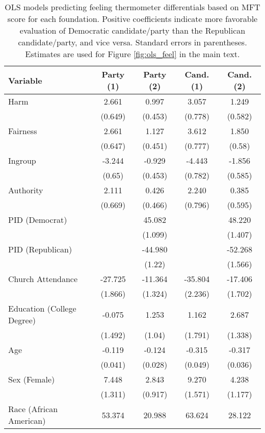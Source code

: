 \begin{table}[h]
\centering
\caption{OLS models predicting feeling thermometer differentials based on
           MFT score for each foundation. Positive coefficients indicate more favorable evaluation 
           of Democratic candidate/party than the Republican candidate/party, and vice versa. 
           Standard errors in parentheses. Estimates are used for Figure \ref{fig:ols_feel} 
           in the main text.} 
\label{tab:ols_feel}
\begingroup\footnotesize
\begin{tabular}{lcccc}
  \hline
Variable & Party (1) & Party (2) & Cand. (1) & Cand. (2) \\ 
  \hline
Harm &   2.661 &   0.997 &   3.057 &   1.249 \\ 
   & (0.649) & (0.453) & (0.778) & (0.582) \\ 
  Fairness &   2.661 &   1.127 &   3.612 &   1.850 \\ 
   & (0.647) & (0.451) & (0.777) & (0.58) \\ 
  Ingroup &  -3.244 &  -0.929 &  -4.443 &  -1.856 \\ 
   & (0.65) & (0.453) & (0.782) & (0.585) \\ 
  Authority &   2.111 &   0.426 &   2.240 &   0.385 \\ 
   & (0.669) & (0.466) & (0.796) & (0.595) \\ 
  PID (Democrat) &  &  45.082 &  &  48.220 \\ 
   &  & (1.099) &  & (1.407) \\ 
  PID (Republican) &  & -44.980 &  & -52.268 \\ 
   &  & (1.22) &  & (1.566) \\ 
  Church Attendance & -27.725 & -11.364 & -35.804 & -17.406 \\ 
   & (1.866) & (1.324) & (2.236) & (1.702) \\ 
  Education (College Degree) &  -0.075 &   1.253 &   1.162 &   2.687 \\ 
   & (1.492) & (1.04) & (1.791) & (1.338) \\ 
  Age &  -0.119 &  -0.124 &  -0.315 &  -0.317 \\ 
   & (0.041) & (0.028) & (0.049) & (0.036) \\ 
  Sex (Female) &   7.448 &   2.843 &   9.270 &   4.238 \\ 
   & (1.311) & (0.917) & (1.571) & (1.177) \\ 
  Race (African American) &  53.374 &  20.988 &  63.624 &  28.122 \\ 

\end{tabular}
\end{table}
